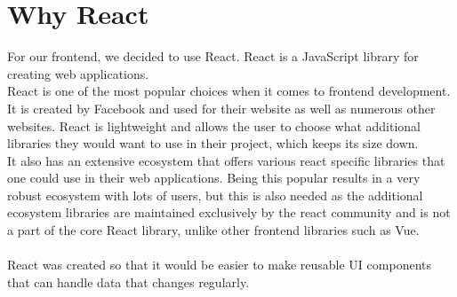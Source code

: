 \section{Why React}
For our frontend, we decided to use React.
React is a JavaScript library for creating web applications\cite{ReactJS}. 
\\
React is one of the most popular choices when it comes to frontend development\cite{NPMVueReactAngular}.
It is created by Facebook and used for their website as well as numerous other websites\cite{ReactHistory}.
React is lightweight and allows the user to choose what additional libraries they would want to use in their project, which keeps its size down.
\\
It also has an extensive ecosystem that offers various react specific libraries that one could use in their web applications.
Being this popular results in a very robust ecosystem with lots of users, but this is also needed as the additional ecosystem libraries are maintained exclusively by the react community and is not a part of the core React library, unlike other frontend libraries such as Vue\cite{Vue}.
\\\\
React was created so that it would be easier to make reusable UI components that can handle data that changes regularly\cite{ReactHistory}.